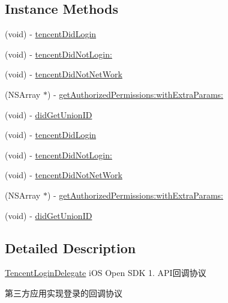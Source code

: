 \subsection*{Instance Methods}
\begin{DoxyCompactItemize}
\item 
(void) -\/ \mbox{\hyperlink{protocol_tencent_login_delegate_01-p_a3da4bdedd40aee983a4b60730a6a1f98}{tencent\+Did\+Login}}
\item 
(void) -\/ \mbox{\hyperlink{protocol_tencent_login_delegate_01-p_a491751b07281e6278a6e885668e20044}{tencent\+Did\+Not\+Login\+:}}
\item 
(void) -\/ \mbox{\hyperlink{protocol_tencent_login_delegate_01-p_a575251b715cf413d43fba79cfaa4041c}{tencent\+Did\+Not\+Net\+Work}}
\item 
(N\+S\+Array $\ast$) -\/ \mbox{\hyperlink{protocol_tencent_login_delegate_01-p_ab3392549822603828a45b1decad6cb1c}{get\+Authorized\+Permissions\+:with\+Extra\+Params\+:}}
\item 
(void) -\/ \mbox{\hyperlink{protocol_tencent_login_delegate_01-p_aef893d5be890ee0834f1a425ea1a0623}{did\+Get\+Union\+ID}}
\item 
(void) -\/ \mbox{\hyperlink{protocol_tencent_login_delegate_01-p_a3da4bdedd40aee983a4b60730a6a1f98}{tencent\+Did\+Login}}
\item 
(void) -\/ \mbox{\hyperlink{protocol_tencent_login_delegate_01-p_a491751b07281e6278a6e885668e20044}{tencent\+Did\+Not\+Login\+:}}
\item 
(void) -\/ \mbox{\hyperlink{protocol_tencent_login_delegate_01-p_a575251b715cf413d43fba79cfaa4041c}{tencent\+Did\+Not\+Net\+Work}}
\item 
(N\+S\+Array $\ast$) -\/ \mbox{\hyperlink{protocol_tencent_login_delegate_01-p_ab3392549822603828a45b1decad6cb1c}{get\+Authorized\+Permissions\+:with\+Extra\+Params\+:}}
\item 
(void) -\/ \mbox{\hyperlink{protocol_tencent_login_delegate_01-p_aef893d5be890ee0834f1a425ea1a0623}{did\+Get\+Union\+ID}}
\end{DoxyCompactItemize}


\subsection{Detailed Description}
\mbox{\hyperlink{class_tencent_login_delegate-p}{Tencent\+Login\+Delegate}} i\+OS Open S\+DK 1. A\+P\+I回调协议 

第三方应用实现登录的回调协议 


